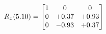 \documentclass[preview]{standalone}
\begin{document}
\begin{align*}
\special{dvisvgm:raw <g id='unique000'>}R_{x}(5.10) = \begin{bmatrix}1 & 0 & 0 \\0 & +0.37 & +0.93 \\0 & -0.93 & +0.37\end{bmatrix}\special{dvisvgm:raw </g>}
\end{align*}
\end{document}
